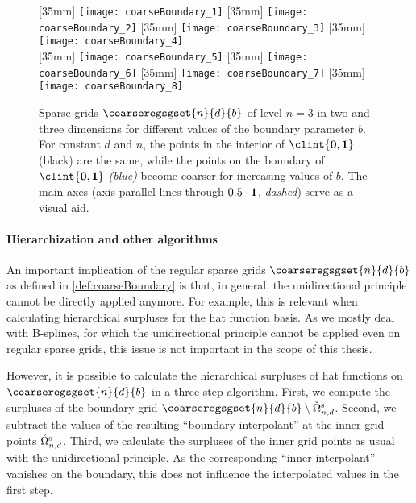 \begin{figure}
  [35mm]{%
    \texttt{[image: coarseBoundary\_1]}%
  }%
  \hfill%
  [35mm]{%
    \texttt{[image: coarseBoundary\_2]}%
  }%
  \hfill%
  [35mm]{%
    \texttt{[image: coarseBoundary\_3]}%
  }%
  \hfill%
  [35mm]{%
    \texttt{[image: coarseBoundary\_4]}%
  }\\[2mm]%
  [35mm]{%
    \texttt{[image: coarseBoundary\_5]}%
  }%
  \hfill%
  [35mm]{%
    \texttt{[image: coarseBoundary\_6]}%
  }%
  \hfill%
  [35mm]{%
    \texttt{[image: coarseBoundary\_7]}%
  }%
  \hfill%
  [35mm]{%
    \texttt{[image: coarseBoundary\_8]}%
  }%
  \caption[%
    Comparison of regular sparse grids with coarse boundary%
  ]{%
    Sparse grids $\coarseregsgset{n}{d}{b}$ of level $n = 3$
    in two and three dimensions for different values of the
    boundary parameter $b$.
    For constant $d$ and $n$,
    the points in the interior of $\clint{\*0, \*1}$
    (black) are the same,
    while the points on the boundary of $\clint{\*0, \*1}$
    \emph{\textcolor{mittelblau}{(blue)}} become coarser
    for increasing values of $b$.
    The main axes (axis-parallel lines through $0.5 \cdot {\boldsymbol{1}}$, \emph{dashed})
    serve as a visual aid.%
  }%
  \label{fig:coarseBoundary}%
\end{figure}

\paragraph{Hierarchization and other algorithms}

An important implication of the regular sparse grids
$\coarseregsgset{n}{d}{b}$ as defined in \cref{def:coarseBoundary}
is that, in general,
the unidirectional principle cannot be directly applied anymore.
For example, this is relevant when calculating hierarchical surpluses
for the hat function basis.
As we mostly deal with B-splines, for which the unidirectional
principle cannot be applied even on regular sparse grids,
this issue is not important in the scope of this thesis.

However, it is possible to calculate the hierarchical surpluses
of hat functions on $\coarseregsgset{n}{d}{b}$ in a three-step algorithm.
First, we compute the surpluses of the boundary grid
$\coarseregsgset{n}{d}{b} \setminus \interiorregsgset{n}{d}$.
Second, we subtract the values of the resulting ``boundary interpolant'' at
the inner grid points
$\interiorregsgset{n}{d}$.
Third, we calculate the surpluses of the inner grid points
as usual with the unidirectional principle.
As the corresponding ``inner interpolant'' vanishes
on the boundary, this does not influence the interpolated values in the
first step.



